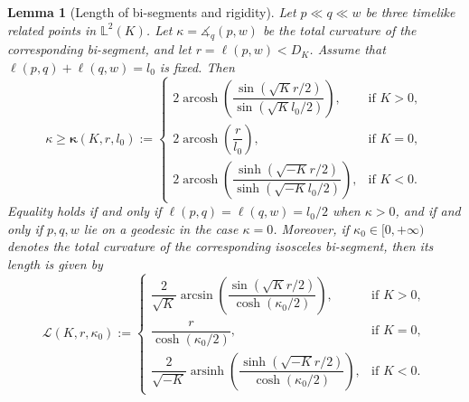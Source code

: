 \documentclass[hidelinks,12pt,a4paper]{article}
\numberwithin{equation}{section}
\theoremstyle{plain}
\newtheorem{lemma}[definition]{Lemma}
\theoremstyle{definition}
\DeclareMathOperator{\arcosh}{arcosh}
\newcommand{\lm}[1]{\mathbb{L}^2(#1)}
\newcommand{\ma}{\ensuremath{\measuredangle}}
\begin{document}
\begin{lemma}[Length of bi-segments and rigidity]
\label{lem: bi-segment and rigidity}
Let $p\ll q\ll w$ be three timelike related points in $\lm{K}$. 
Let $\kappa=\ma_{q}(p,w)$ be the total curvature of the corresponding bi-segment, and let $r=\ell(p,w)<D_K$. 
Assume that $\ell(p,q)+\ell(q,w)=l_0$ is fixed. 
Then
\begin{equation*}
\label{total bound}
\kappa\geq \bm{\kappa}(K,r,l_0):=
\begin{cases}
2\arcosh\left(\dfrac{\sin(\sqrt{K}r/2)}{\sin(\sqrt{K}l_0/2)}\right), 
& \mathrm{if}\,\,K>0,\\[1.2ex]
2\arcosh\left(\dfrac{r}{l_0}\right), 
& \mathrm{if}\,\,K=0,\\[1.2ex]
2\arcosh\left(\dfrac{\sinh(\sqrt{-K}r/2)}{\sinh(\sqrt{-K}l_0/2)}\right), 
& \mathrm{if}\,\,K<0.
\end{cases}
\end{equation*}
Equality holds if and only if $\ell(p,q)=\ell(q,w)=l_0/2$ when $\kappa>0$, and if and only if $p,q,w$ lie on a geodesic in the case $\kappa=0$. Moreover, if $\kappa_0\in[0,+\infty)$ denotes the total curvature of the corresponding isosceles bi-segment, then its length is given by
\begin{equation}
\label{length bound}
\mathcal{L}(K,r,\kappa_0):=
\begin{cases}
\dfrac{2}{\sqrt{K}}\arcsin\left(\dfrac{\sin(\sqrt{K}r/2)}{\cosh(\kappa_0/2)}\right), & \mathrm{if}\,\,K>0,\\[1.2ex]
\dfrac{r}{\cosh(\kappa_0/2)}, & \mathrm{if}\,\,K=0,\\[1.2ex]
\dfrac{2}{\sqrt{-K}}\operatorname{arsinh}\left(\dfrac{\sinh(\sqrt{-K}r/2)}{\cosh(\kappa_0/2)}\right), & \mathrm{if}\,\,K<0.
\end{cases}
\end{equation}
\end{lemma}
\end{document}
